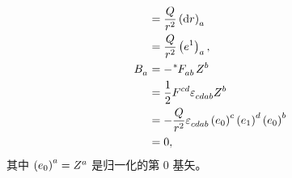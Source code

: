 \begin{xiti}
\begin{zm}
\begin{equation*}
\begin{split}
                &= \frac{Q}{r^2} \tensor{\left( \dd{r} \right)}{_a}\\
                &= \frac{Q}{r^2} \tensor{\left( e^1 \right)}{_a},\\
                \tensor{B}{_a} &= - \tensor[^*]{F}{_a_b} \tensor{Z}{^b}\\
                &= \frac{1}{2} \tensor{F}{^c^d} \tensor{\varepsilon}{_c_d_a_b} \tensor{Z}{^b}\\
                &= - \frac{Q}{r^2} \tensor{\varepsilon}{_c_d_a_b} \tensor{\left( e_0 \right)}{^c} \tensor{\left( e_1 \right)}{^d} \tensor{\left( e_0 \right)}{^b}\\
                &= 0,
            \end{split}
        \end{equation*}
        其中 $\tensor{\left( e_0 \right)}{^a} = \tensor{Z}{^a}$ 是归一化的第 0 基矢。
    \end{zm}
    
\end{xiti}
